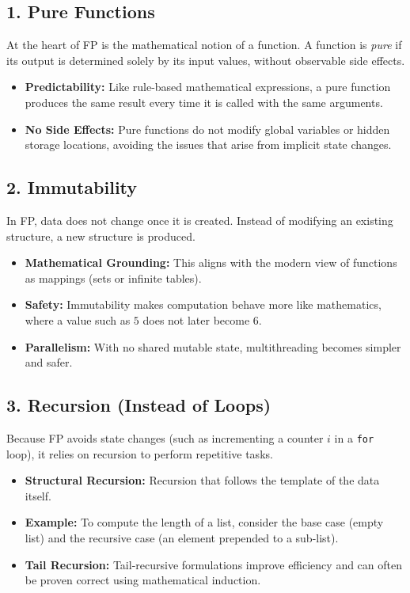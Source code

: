 \documentclass[12pt]{article}
\begin{document}
\subsection{1. Pure Functions}

At the heart of FP is the mathematical notion of a function. A function is \emph{pure} if its output is determined solely by its input values, without observable side effects.

\begin{itemize}
  \item \textbf{Predictability:} Like rule-based mathematical expressions, a pure function produces the same result every time it is called with the same arguments.
  \item \textbf{No Side Effects:} Pure functions do not modify global variables or hidden storage locations, avoiding the issues that arise from implicit state changes.
\end{itemize}

\subsection{2. Immutability}

In FP, data does not change once it is created. Instead of modifying an existing structure, a new structure is produced.

\begin{itemize}
  \item \textbf{Mathematical Grounding:} This aligns with the modern view of functions as mappings (sets or infinite tables).
  \item \textbf{Safety:} Immutability makes computation behave more like mathematics, where a value such as $5$ does not later become $6$.
  \item \textbf{Parallelism:} With no shared mutable state, multithreading becomes simpler and safer.
\end{itemize}

\subsection{3. Recursion (Instead of Loops)}

Because FP avoids state changes (such as incrementing a counter $i$ in a \texttt{for} loop), it relies on recursion to perform repetitive tasks.

\begin{itemize}
  \item \textbf{Structural Recursion:} Recursion that follows the template of the data itself.
  \item \textbf{Example:} To compute the length of a list, consider the base case (empty list) and the recursive case (an element prepended to a sub-list).
  \item \textbf{Tail Recursion:} Tail-recursive formulations improve efficiency and can often be proven correct using mathematical induction.
\end{itemize}
\end{document}
